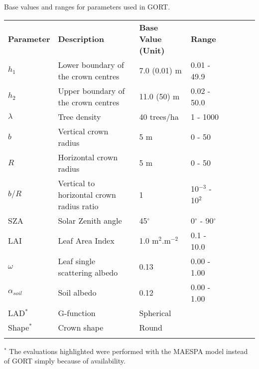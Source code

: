 \begin{threeparttable}
\centering
\caption{Base values and ranges for parameters used in GORT.}
\begin{tabular}{lP{0.20\textwidth} lP{0.25\textwidth} lP{0.25\textwidth} lP{0.25\textwidth}}
     \hline
     \hline
\textbf{Parameter}   & \textbf{Description} & \textbf{Base Value (Unit)} & \textbf{Range} \\
\noalign{\smallskip}\hline
$h_1$          & Lower boundary of the crown centres       & 7.0  (0.01) m & 0.01 - 49.9 \\
$h_2$          & Upper boundary of the crown centres       & 11.0  (50) m & 0.02 - 50.0 \\
$\lambda$         & Tree density                              & 40 trees/ha &  1 - 1000\\
$b$            & Vertical crown radius                     & 5 m & 0 - 50\\ 
$R$            & Horizontal crown radius                   & 5 m &  0 - 50\\
$b/R$           & Vertical to horizontal crown radius ratio & 1 & 10$^{-3}$ - 10$^2$\\
SZA            & Solar Zenith angle                        & 45$^{\circ}$ & 0$^{\circ}$ - 90$^{\circ}$ \\
LAI            & Leaf Area Index                           & 1.0 m$^2$.m$^{-2}$ &  0.1 - 10.0\\
$\omega$           & Leaf single scattering albedo             & 0.13 &  0.00 - 1.00\\
$\alpha_{soil}$  & Soil albedo                               & 0.12 & 0.00 - 1.00\\ 
LAD$^*$             & G-function                                & Spherical & \citet{deWit1965} \\
Shape$^*$           & Crown shape                               & Round & \citet{Duursma2012} \\
\hline
\hline\noalign{\bigskip}
\end{tabular}
\begin{tablenotes}
      \small
      \item $^*$ The evaluations highlighted were performed with the MAESPA model instead of GORT
            simply because of availability.  
\end{tablenotes}
\label{tab:parameters_gort}
\end{threeparttable}

